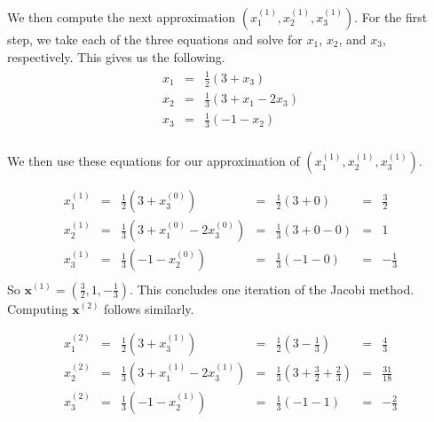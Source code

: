 We then compute the next approximation $(x^{(1)}_1, x^{(1)}_2, x^{(1)}_3)$.
For the first step, we take each of the three equations and solve for $x_1$,
$x_2$, and $x_3$, respectively. This gives us the following.
\begin{align*}
\begin{array}{ccccccc}
  x_1 & = & \frac{1}{2} ( 3 + x_3) \\
  x_2 & = & \frac{1}{3} ( 3 + x_1 - 2x_3) \\
  x_3 & = & \frac{1}{3} ( -1 - x_2) \\
\end{array}
\end{align*}

We then use these equations for our approximation of $(x^{(1)}_1, x^{(1)}_2, x^{(1)}_3)$.

$$
\begin{matrix}
x^{(1)}_1 & = & \frac{1}{2} ( 3 + x^{(0)}_3)  & = & \frac{1}{2} (3 + 0)     & = & \frac{3}{2} \\
x^{(1)}_2 & = & \frac{1}{3} ( 3 + x^{(0)}_1 - 2x^{(0)}_3) & = & \frac{1}{3} (3 + 0 - 0) & = & 1 \\
x^{(1)}_3 & = & \frac{1}{3} ( -1 - x^{(0)}_2)       & = & \frac{1}{3} (-1 - 0)    & = & -\frac{1}{3} \\
\end{matrix}
$$
So $\mathbf{x}^{(1)} = (\frac{3}{2}, 1, -\frac{1}{3})$. This concludes one iteration of
the Jacobi method. Computing $\mathbf{x}^{(2)}$ follows similarly.

$$
\begin{matrix}
x^{(2)}_1 & = & \frac{1}{2} ( 3 + x^{(1)}_3)  & = & \frac{1}{2} (3 - \frac{1}{3})     & = & \frac{4}{3} \\
x^{(2)}_2 & = & \frac{1}{3} ( 3 + x^{(1)}_1 - 2x^{(1)}_3) & = & \frac{1}{3} (3 + \frac{3}{2} + \frac{2}{3}) & = &  \frac{31}{18} \\
x^{(2)}_3 & = & \frac{1}{3} ( -1 - x^{(1)}_2)       & = & \frac{1}{3} (-1 - 1)    & = & -\frac{2}{3} \\
\end{matrix}
$$

